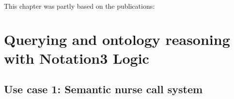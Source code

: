 \documentclass[11pt,a4paper,twoside]{book}
\begin{document}

\vspace{0.3cm}





\newpage
This chapter was partly based on the publications:
\vspace{0.3cm}


\vspace{0.3cm}



%






 \chapter{Querying and ontology reasoning with Notation3 Logic}\label{others}
 
 \section{Use case 1: Semantic nurse call system}\label{orca}
 
 
 \label{validation}
% 
% 
 
\end{document}
